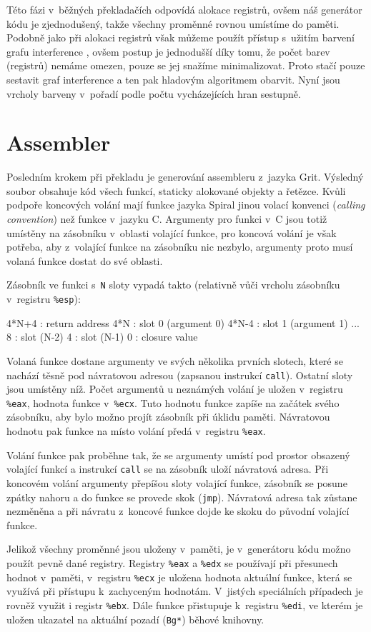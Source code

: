 Této fázi v~běžných překladačích odpovídá alokace registrů, ovšem náš generátor
kódu je zjednodušený, takže všechny proměnné rovnou umístíme do paměti. Podobně
jako při alokaci registrů však můžeme použít přístup s~užitím barvení grafu
interference
\cite{chaitin1981register,chaitin1982register,briggs1994improvements}, ovšem
postup je jednodušší díky tomu, že počet barev (registrů) nemáme omezen, pouze
se jej snažíme minimalizovat. Proto stačí pouze sestavit graf interference a ten
pak hladovým algoritmem obarvit. Nyní jsou vrcholy barveny v~pořadí podle počtu
vycházejících hran sestupně.

\section{Assembler}

Posledním krokem při překladu je generování assembleru z~jazyka Grit. Výsledný
soubor obsahuje kód všech funkcí, staticky alokované objekty a řetězce.  Kvůli
podpoře koncových volání mají funkce jazyka Spiral jinou volací konvenci
(\emph{calling convention}) než funkce v~jazyku C. Argumenty pro funkci v~C jsou
totiž umístěny na zásobníku v~oblasti volající funkce, pro koncová volání je
však potřeba, aby z~volající funkce na zásobníku nic nezbylo, argumenty proto
musí volaná funkce dostat do své oblasti.

Zásobník ve funkci s~\texttt{N} sloty vypadá takto (relativně vůči vrcholu
zásobníku v~registru \texttt{\%esp}):

\begin{ttcode}
  4*N+4  :  return address
    4*N  :  slot 0 (argument 0)
  4*N-4  :  slot 1 (argument 1)
            ...
      8  :  slot (N-2)
      4  :  slot (N-1)
      0  :  closure value
\end{ttcode}

Volaná funkce dostane argumenty ve svých několika prvních slotech, které se
nachází těsně pod návratovou adresou (zapsanou instrukcí \texttt{call}). Ostatní
sloty jsou umístěny níž. Počet argumentů u neznámých volání je uložen v~registru
\texttt{\%eax}, hodnota funkce v~\texttt{\%ecx}. Tuto hodnotu funkce zapíše na
začátek svého zásobníku, aby bylo možno projít zásobník při úklidu paměti.
Návratovou hodnotu pak funkce na místo volání předá v~registru \texttt{\%eax}.

Volání funkce pak proběhne tak, že se argumenty umístí pod prostor obsazený
volající funkcí a instrukcí \texttt{call} se na zásobník uloží návratová adresa.
Při koncovém volání argumenty přepíšou sloty volající funkce, zásobník se posune
zpátky nahoru a do funkce se provede skok (\texttt{jmp}). Návratová adresa tak
zůstane nezměněna a při návratu z~koncové funkce dojde ke skoku do původní
volající funkce.

Jelikož všechny proměnné jsou uloženy v~paměti, je v~generátoru kódu možno
použít pevně dané registry. Registry \texttt{\%eax} a \texttt{\%edx} se
používají při přesunech hodnot v~paměti, v~registru \texttt{\%ecx} je uložena
hodnota aktuální funkce, která se využívá při přístupu k~zachyceným hodnotám.
V~jistých speciálních případech je rovněž využit i registr \texttt{\%ebx}. Dále
funkce přistupuje k~registru \texttt{\%edi}, ve kterém je uložen ukazatel na
aktuální pozadí (\texttt{Bg*}) běhové knihovny.
